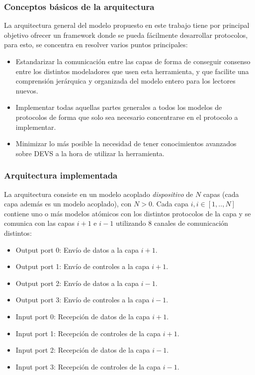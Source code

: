 \documentclass[10pt,a4paper]{article}
\begin{document}
\subsubsection{Conceptos básicos de la arquitectura}

La arquitectura general del modelo propuesto en este trabajo tiene por principal objetivo ofrecer un framework donde se pueda fácilmente desarrollar protocolos, para esto, se concentra en resolver varios puntos principales:

\begin{itemize}
\item Estandarizar la comunicación entre las capas de forma de conseguir consenso entre los distintos modeladores que usen esta herramienta, y que facilite una comprensión jerárquica y organizada del modelo entero para los lectores nuevos.
\item Implementar todas aquellas partes generales a todos los modelos de protocolos de forma que solo sea necesario concentrarse en el protocolo a implementar.
\item Minimizar lo más posible la necesidad de tener conocimientos avanzados sobre DEVS a la hora de utilizar la herramienta.
\end{itemize}

\newpage

\subsubsection{Arquitectura implementada}
La arquitectura consiste en un modelo acoplado \textit{dispositivo} de $N$ capas (cada capa además es un modelo acoplado), con $N > 0$. Cada capa $i, i \in [1,..,N]$ contiene uno o más modelos atómicos con los distintos protocolos de la capa y se comunica con las capas $i+1$ e $i-1$ utilizando $8$ canales de comunicación distintos:

\begin{itemize}
\item Output port 0: Envío de datos a la capa $i+1$.
\item Output port 1: Envío de controles a la capa $i+1$.
\item Output port 2: Envío de datos a la capa $i-1$.
\item Output port 3: Envío de controles a la capa $i-1$.
\item Input port 0: Recepción de datos de la capa $i+1$.
\item Input port 1: Recepción de controles de la capa $i+1$.
\item Input port 2: Recepción de datos de la capa $i-1$.
\item Input port 3: Recepción de controles de la capa $i-1$.
\end{itemize}
\end{document}
